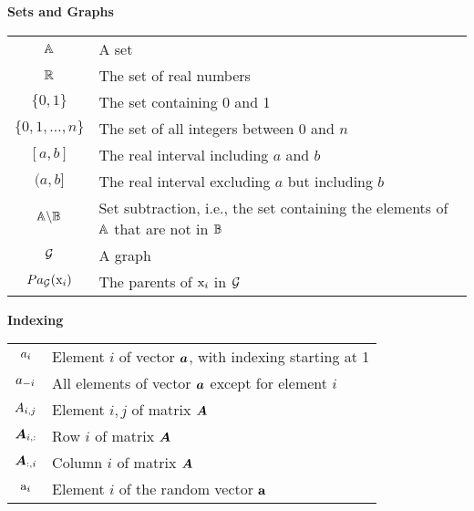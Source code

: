 \vspace{\notationgap}
\begin{minipage}{\textwidth}
\centerline{\bf Sets and Graphs}
\bgroup
\def\arraystretch{1.5}
\begin{tabular}{cp{3.25in}}
$\displaystyle {\mathbb{A}}$ & A set\\
$\displaystyle \mathbb{R}$ & The set of real numbers \\
$\displaystyle \{0, 1\}$ & The set containing 0 and 1 \\
$\displaystyle \{0, 1, \dots, n \}$ & The set of all integers between $0$ and $n$\\
$\displaystyle [a, b]$ & The real interval including $a$ and $b$\\
$\displaystyle (a, b]$ & The real interval excluding $a$ but including $b$\\
$\displaystyle {\mathbb{A}} \backslash {\mathbb{B}}$ & Set subtraction, i.e., the set containing the elements of ${\mathbb{A}}$ that are not in ${\mathbb{B}}$\\
$\displaystyle {\mathcal{G}}$ & A graph\\
$\displaystyle Pa_{\mathcal{G}}({\textnormal{x}}_i)$ & The parents of ${\textnormal{x}}_i$ in ${\mathcal{G}}$
\end{tabular}
\egroup
{}
\end{minipage}

\vspace{\notationgap}
\begin{minipage}{\textwidth}
\centerline{\bf Indexing}
\bgroup
\def\arraystretch{1.5}
\begin{tabular}{cp{3.25in}}
$\displaystyle {a}_i$ & Element $i$ of vector ${\bm{a}}$, with indexing starting at 1 \\
$\displaystyle {a}_{-i}$ & All elements of vector ${\bm{a}}$ except for element $i$ \\
$\displaystyle {A}_{i,j}$ & Element $i, j$ of matrix ${\bm{A}}$ \\
$\displaystyle {\bm{A}}_{i, :}$ & Row $i$ of matrix ${\bm{A}}$ \\
$\displaystyle {\bm{A}}_{:, i}$ & Column $i$ of matrix ${\bm{A}}$ \\
$\displaystyle {\textnormal{a}}_i$ & Element $i$ of the random vector ${\mathbf{a}}$ \\
\end{tabular}
\egroup
\end{minipage}

